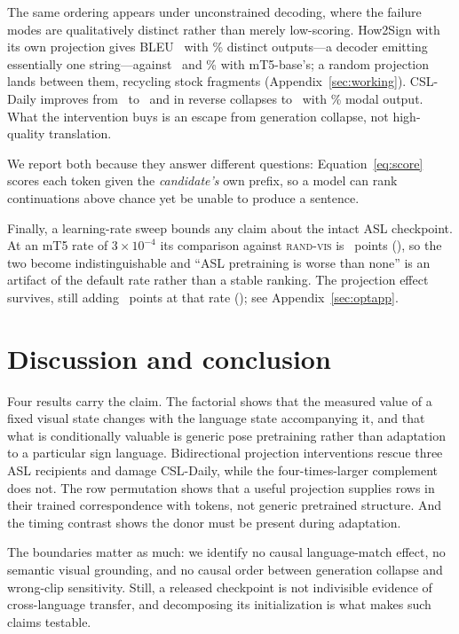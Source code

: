 \documentclass[11pt]{article}
\begin{document}
The same ordering appears under unconstrained decoding, where the failure modes
are qualitatively distinct rather than merely low-scoring. How2Sign with its own
projection gives BLEU \HowtwosignBleu\ with \HowtwosignUniq\% distinct
outputs---a decoder emitting essentially one string---against \HeadHowBaseBleu\
and \HeadHowBaseUniq\% with mT5-base's; a random projection lands between them,
recycling stock fragments (Appendix~\ref{sec:working}). CSL-Daily improves from
\CsldailyBleu\ to \HeadCslBaseBleu\ and in reverse collapses to
\HeadCslHowBleu\ with \HeadCslHowModal\% modal output. What the intervention
buys is an escape from generation collapse, not high-quality translation.

We report both because they answer different questions: Equation~\ref{eq:score}
scores each token given the \emph{candidate's} own prefix, so a model can rank
continuations above chance yet be unable to produce a sentence.

Finally, a learning-rate sweep bounds any claim about the intact ASL checkpoint.
At an mT5 rate of $3\times10^{-4}$ its comparison against \textsc{rand-vis} is
\LrThreeEFourVsRandvisLexDelta\ points (\LrThreeEFourVsRandvisLexCI), so the two
become indistinguishable and ``ASL pretraining is worse than none'' is an artifact
of the default rate rather than a stable ranking. The projection effect survives,
still adding \HeadGainAtLrThreeEFourLexDeltaAbs\ points at that rate
(\HeadGainAtLrThreeEFourLexCI); see Appendix~\ref{sec:optapp}.

\section{Discussion and conclusion}

Four results carry the claim. The factorial shows that the measured value of a
fixed visual state changes with the language state accompanying it, and that what
is conditionally valuable is generic pose pretraining rather than adaptation to a
particular sign language. Bidirectional projection interventions rescue three ASL
recipients and damage CSL-Daily, while the four-times-larger complement does not.
The row permutation shows that a useful projection supplies rows in their trained
correspondence with tokens, not generic pretrained structure. And the timing
contrast shows the donor must be present during adaptation.

The boundaries matter as much: we identify no causal language-match effect, no
semantic visual grounding, and no causal order between generation collapse and
wrong-clip sensitivity. Still, a released checkpoint is not indivisible evidence
of cross-language transfer, and decomposing its initialization is what makes such
claims testable.
\end{document}
